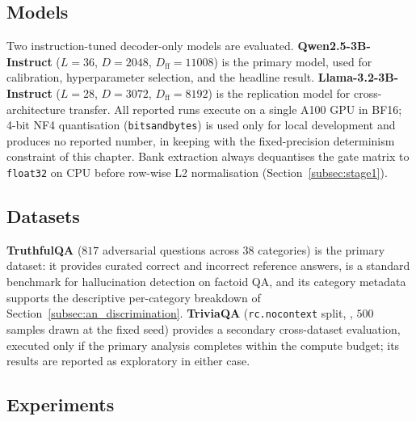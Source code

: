 \subsection{Models}
\label{subsec:models}

Two instruction-tuned decoder-only models are evaluated.
\textbf{Qwen2.5-3B-Instruct} \citep{qwen2025qwen25}
($L = 36$, $D = 2048$, $D_{\mathrm{ff}} = 11008$) is the primary model,
used for calibration, hyperparameter selection, and the headline result.
\textbf{Llama-3.2-3B-Instruct} \citep{grattafiori2024llama3}
($L = 28$, $D = 3072$, $D_{\mathrm{ff}} = 8192$) is the replication model
for cross-architecture transfer. All reported runs execute on a single
A100 GPU in BF16; 4-bit NF4 quantisation (\texttt{bitsandbytes}) is used
only for local development and produces no reported number, in keeping
with the fixed-precision determinism constraint of this chapter. Bank
extraction always dequantises the gate matrix to \texttt{float32} on CPU
before row-wise L2 normalisation
(Section~\ref{subsec:stage1}).

\subsection{Datasets}
\label{subsec:datasets}

\textbf{TruthfulQA} \citep{lin2022truthfulqa} ($817$ adversarial questions
across $38$ categories) is the primary dataset: it provides curated
correct and incorrect reference answers, is a standard benchmark for
hallucination detection on factoid QA, and its category metadata supports
the descriptive per-category breakdown of
Section~\ref{subsec:an_discrimination}. \textbf{TriviaQA}
(\texttt{rc.nocontext} split, \citealt{joshi2017triviaqa}, $500$ samples
drawn at the fixed seed) provides a secondary cross-dataset evaluation,
executed only if the primary analysis completes within the compute budget;
its results are reported as exploratory in either case.

\subsection{Experiments}
\label{subsec:experiments}

